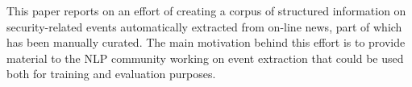 This paper reports on an effort of creating a corpus of structured information on security-related events automatically extracted from on-line news, part of which has been manually curated. The main motivation behind this effort is to provide material to the NLP community working on event extraction that could be used both for training and evaluation purposes.

